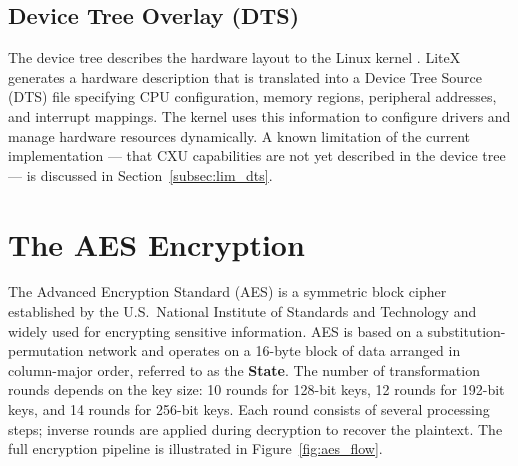 \subsection{Device Tree Overlay (DTS)}
\label{subsec:dts}

The device tree describes the hardware layout to the Linux kernel \cite{DeviceTreeDoc}.
LiteX generates a hardware description that is translated into a Device Tree Source
(DTS) file specifying CPU configuration, memory regions, peripheral addresses, and
interrupt mappings.
The kernel uses this information to configure drivers and manage hardware resources
dynamically.
A known limitation of the current implementation --- that CXU capabilities are not yet
described in the device tree --- is discussed in Section~\ref{subsec:lim_dts}.

\section{The AES Encryption}
\label{sec:aes}

The Advanced Encryption Standard (AES) \cite{NISTAES} is a symmetric block cipher
established by the U.S.\ National Institute of Standards and Technology and widely
used for encrypting sensitive information.
AES is based on a substitution-permutation network and operates on a 16-byte block
of data arranged in column-major order, referred to as the \textbf{State}.
The number of transformation rounds depends on the key size: 10 rounds for 128-bit
keys, 12 rounds for 192-bit keys, and 14 rounds for 256-bit keys.
Each round consists of several processing steps; inverse rounds are applied during
decryption to recover the plaintext.
The full encryption pipeline is illustrated in Figure~\ref{fig:aes_flow}.

